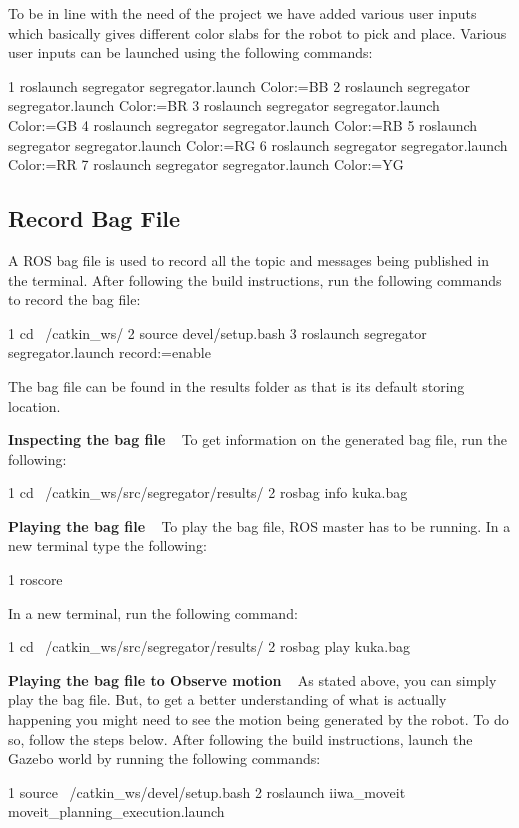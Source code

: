 To be in line with the need of the project we have added various user inputs which basically gives different color slabs for the robot to pick and place. Various user inputs can be launched using the following commands\+: 
\begin{DoxyCode}
1 roslaunch segregator segregator.launch Color:=BB
2 roslaunch segregator segregator.launch Color:=BR
3 roslaunch segregator segregator.launch Color:=GB
4 roslaunch segregator segregator.launch Color:=RB
5 roslaunch segregator segregator.launch Color:=RG
6 roslaunch segregator segregator.launch Color:=RR
7 roslaunch segregator segregator.launch Color:=YG
\end{DoxyCode}
 \subsection*{Record Bag File}

A R\+OS bag file is used to record all the topic and messages being published in the terminal. After following the build instructions, run the following commands to record the bag file\+:


\begin{DoxyCode}
1 cd ~/catkin\_ws/
2 source devel/setup.bash
3 roslaunch segregator segregator.launch record:=enable
\end{DoxyCode}


The bag file can be found in the results folder as that is its default storing location.

{\bfseries Inspecting the bag file} ~\newline
 To get information on the generated bag file, run the following\+:


\begin{DoxyCode}
1 cd ~/catkin\_ws/src/segregator/results/
2 rosbag info kuka.bag
\end{DoxyCode}


{\bfseries Playing the bag file} ~\newline
 To play the bag file, R\+OS master has to be running. In a new terminal type the following\+: 
\begin{DoxyCode}
1 roscore
\end{DoxyCode}
 In a new terminal, run the following command\+: 
\begin{DoxyCode}
1 cd ~/catkin\_ws/src/segregator/results/
2 rosbag play kuka.bag
\end{DoxyCode}


{\bfseries Playing the bag file to Observe motion} ~\newline
 As stated above, you can simply play the bag file. But, to get a better understanding of what is actually happening you might need to see the motion being generated by the robot. To do so, follow the steps below. After following the build instructions, launch the Gazebo world by running the following commands\+: 
\begin{DoxyCode}
1 source ~/catkin\_ws/devel/setup.bash
2 roslaunch iiwa\_moveit moveit\_planning\_execution.launch
\end{DoxyCode}


